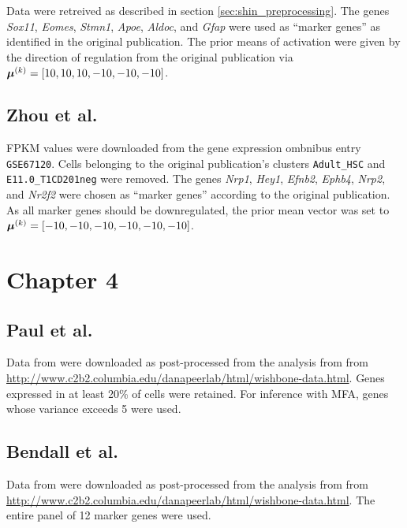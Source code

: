 Data were retreived as described in section \ref{sec:shin_preprocessing}. The genes \emph{Sox11}, \emph{Eomes}, \emph{Stmn1}, \emph{Apoe}, \emph{Aldoc}, and \emph{Gfap} were used as ``marker genes'' as identified in the original publication. The prior means of activation were given by the direction of regulation from the original publication via $\bm{\mu}^{(k)} = [10, 10, 10, -10, -10, -10]$.

\subsection{Zhou et al.}

FPKM values were downloaded from the gene expression ombnibus entry \texttt{GSE67120}. Cells belonging to the original publication's clusters \texttt{Adult\_HSC} and \texttt{E11.0\_T1CD201neg} were removed. The genes \emph{Nrp1}, \emph{Hey1}, \emph{Efnb2}, \emph{Ephb4}, \emph{Nrp2}, and \emph{Nr2f2} were chosen as ``marker genes'' according to the original publication. As all marker genes should be downregulated, the prior mean vector was set to $\bm{\mu}^{(k)} = [-10, -10, -10, -10, -10, -10]$.


\section{Chapter 4}


\subsection{Paul et al.} 

Data from \cite{paul2015transcriptional} were downloaded as post-processed from the analysis from \cite{setty2016wishbone} from \url{http://www.c2b2.columbia.edu/danapeerlab/html/wishbone-data.html}. Genes expressed in at least 20\% of cells were retained. For inference with MFA, genes whose variance exceeds 5 were used.

\subsection{Bendall et al.} %

Data from \cite{bendall2011single} were downloaded as post-processed from the analysis from \cite{setty2016wishbone} from \url{http://www.c2b2.columbia.edu/danapeerlab/html/wishbone-data.html}. The entire panel of 12 marker genes were used.


